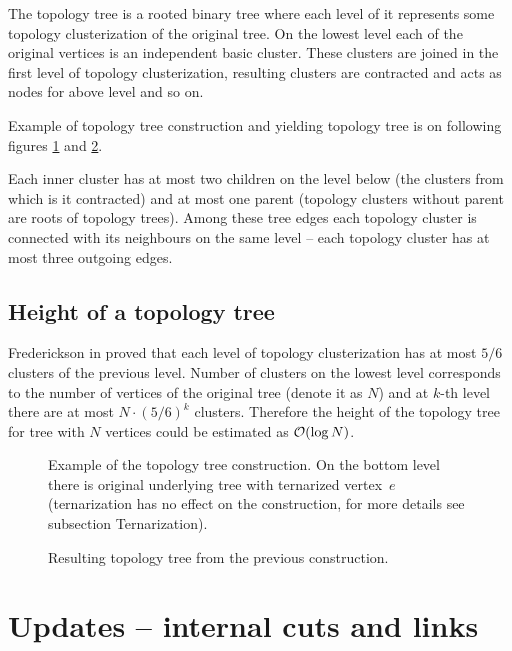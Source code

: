 The {\I topology tree} is a rooted binary tree where each
level of it represents some topology clusterization of the original tree. On the
lowest level each of the original vertices is an independent basic cluster.
These clusters are joined in the first level of topology clusterization,
resulting clusters are contracted and acts as nodes for above level and so on.

Example of topology tree construction and yielding topology tree is on following
figures \ref{fig:topology_tree_construction} and \ref{fig:topology_tree_example}.

Each inner cluster has at most two children on the level below (the clusters
from which is it contracted) and at most one parent (topology clusters without
parent are roots of topology trees). Among these tree edges each topology
cluster is connected with its neighbours on the same level -- each topology
cluster has at most three outgoing edges.

\subsection{Height of a topology tree}

Frederickson in \cite{DSforDynamicallyMaintainingRootedTrees} proved that each
level of topology clusterization has at most $5/6$ clusters of the previous
level. Number of clusters on the lowest level corresponds to the number of
vertices of the original tree (denote it as $N$) and at $k$-th level there are
at most $N\cdot(5/6)^k$ clusters. Therefore the height of the topology tree for
tree with $N$ vertices could be estimated as ${\cal O}(\log N)$.

\begin{figure}[h]
\centering
{}
\caption[Example of the topology tree construction]
{Example of the topology tree construction. On the bottom level there is
original underlying tree with ternarized vertex $\,e$ (ternarization has no effect
on the construction, for more details see subsection Ternarization).}
\label{fig:topology_tree_construction}
\end{figure}

\begin{figure}[H]
\centering
{}
\caption{Resulting topology tree from the previous construction.}
\label{fig:topology_tree_example}
\end{figure}

\section{Updates -- internal cuts and links}

